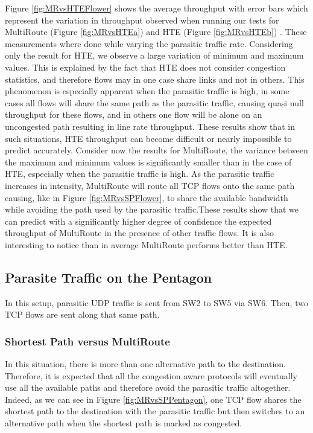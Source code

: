 Figure \ref{fig:MRvsHTEFlower} shows the average throughput with error bars which represent the variation in throughput observed when running our tests for MultiRoute (Figure \ref{fig:MRvsHTEa}) and HTE (Figure \ref{fig:MRvsHTEb}) . These measurements where done while varying the parasitic traffic rate. Considering only the result for HTE, we observe a large variation of minimum and maximum values. This is explained by the fact that HTE does not consider congestion statistics, and therefore flows may in one case share links and not in others. This phenomenon is especially apparent when the parasitic traffic is high, in some cases all flows will share the same path as the parasitic traffic, causing quasi null throughput for these flows, and in others one flow will be alone on an uncongested path resulting in line rate throughput. These results show that in such situations, HTE throughput can become difficult or nearly impossible to predict accurately. Consider now the results for MultiRoute, the variance between the maximum and minimum values is significantly smaller than in the case of HTE, especially when the parasitic traffic is high. As the parasitic traffic increases in intensity, MultiRoute will route all TCP flows onto the same path causing, like in Figure \ref{fig:MRvsSPFlower}, to share the available bandwidth while avoiding the path used by the parasitic traffic.These results show that we can predict with a significantly higher degree of confidence the expected throughput of MultiRoute in the presence of other traffic flows. It is also interesting to notice than in average MultiRoute performs better than HTE.

\subsection{Parasite Traffic on the Pentagon}

In this setup, parasitic UDP traffic is sent from SW2 to SW5 via SW6. Then, two TCP flows are sent along that same path. 

\subsubsection{Shortest Path versus MultiRoute}

In this situation, there is more than one alternative path to the destination. Therefore, it is expected that all the congestion aware protocols will eventually use all the available paths and therefore avoid the parasitic traffic altogether. Indeed, as we can see in Figure \ref{fig:MRvsSPPentagon}, one TCP flow shares the shortest path to the destination with the parasitic traffic but then switches to an alternative path when the shortest path is marked as congested.  

